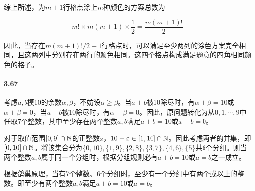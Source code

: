 \documentclass{../notes}
\begin{document}
    综上所述，为$m + 1$行格点涂上$m$种颜色的方案总数为

        \begin{equation}
            m! \times m(m+1)\times \frac{1}{2} = \frac{m(m+1)!}{2}
        \end{equation}

    因此，当存在$m(m+1)!/2+1$行格点时，可以满足至少两列的涂色方案完全相同，且这两列中分别存在两行的颜色相同。这四个格点构成满足题意的四角相同颜色的格子。

    \paragraph*{3.67} 考虑$a, b$模10的余数$\alpha, \beta$，不妨设$\alpha\geq \beta$。当$a+b$被10除尽时，有$\alpha+\beta = 10$或$\alpha + \beta = 0$，当$a - b$被10除尽时，有$\alpha-\beta = 0$。因此，原问题转化为从$0, 1,\cdots ,9$中任取7个整数，其中至少存在两个整数$a, b$满足$a + b = 10$或$a - b = 0$。

    对于取值范围$[0, 9]\cap \mathbb N$的正整数$x$，$10-x\in [1, 10]\cap \mathbb N$。因此考虑两者的并集，即$[0,10]\cap \mathbb N$。将该集合分为$\{0, 10\}, \{1, 9\}, \{2, 8\}, \{3, 7\}, \{4, 6\}, \{5\}$共6个分组。则当两个整数$a, b$属于同一个分组时，根据分组规则必有$a + b = 10$或$a = b$之一成立。

    根据鸽巢原理，当有7个整数、6个分组时，至少有一个分组中有两个或以上的整数。即至少有两个整数$a, b$满足$a + b = 10$或$a = b$。
\end{document}
